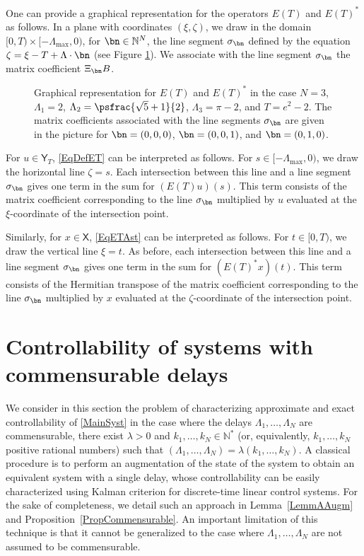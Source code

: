 \begin{remk}
\label{RemkGraphic}
One can provide a graphical representation for the operators $E(T)$ and $E(T)^\ast$ as follows. In a plane with coordinates $(\xi, \zeta)$, we draw in the domain $[0, T) \times [-\Lambda_{\max}, 0)$, for $\bn \in \mathbb N^N$, the line segment $\sigma_{\bn}$ defined by the equation $\zeta = \xi - T + \Lambda \cdot \bn$ (see Figure \ref{FigET}). We associate with the line segment $\sigma_{\bn}$ the matrix coefficient $\Xi_{\bn} B$.

\begin{figure}[ht]
\centering

\caption{Graphical representation for $E(T)$ and $E(T)^\ast$ in the case $N = 3$, $\Lambda_1 = 2$, $\Lambda_2 = \psfrac{\sqrt{5}+1}{2}$, $\Lambda_3 = \pi - 2$, and $T = e^2 - 2$. The matrix coefficients associated with the line segments $\sigma_{\bn}$ are given in the picture for $\bn = (0, 0, 0)$, $\bn = (0, 0, 1)$, and $\bn = (0, 1, 0)$.}
\label{FigET}
\end{figure}

For $u \in \mathsf Y_T$, \eqref{EqDefET} can be interpreted as follows. For $s \in [-\Lambda_{\max}, 0)$, we draw the horizontal line $\zeta = s$. Each intersection between this line and a line segment $\sigma_{\bn}$ gives one term in the sum for $(E(T)u)(s)$. This term consists of the matrix coefficient corresponding to the line $\sigma_{\bn}$ multiplied by $u$ evaluated at the $\xi$-coordinate of the intersection point.

Similarly, for $x \in \mathsf X$, \eqref{EqETAst} can be interpreted as follows. For $t \in [0, T)$, we draw the vertical line $\xi = t$. As before, each intersection between this line and a line segment $\sigma_{\bn}$ gives one term in the sum for $(E(T)^\ast x)(t)$. This term consists of the Hermitian transpose of the matrix coefficient corresponding to the line $\sigma_{\bn}$ multiplied by $x$ evaluated at the $\zeta$-coordinate of the intersection point.
\end{remk}

\section{Controllability of systems with commensurable delays}
\label{SecCommensurable}

We consider in this section the problem of characterizing approximate and exact controllability of \eqref{MainSyst} in the case where the delays $\Lambda_1, \dots, \Lambda_N$ are commensurable, \ie there exist $\lambda > 0$ and $k_1, \dots, k_N \in \mathbb N^\ast$ (or, equivalently, $k_1, \dots, k_N$ positive rational numbers) such that $(\Lambda_1, \dots, \Lambda_N) = \lambda (k_1, \dots, k_N)$. A classical procedure is to perform an augmentation of the state of the system to obtain an equivalent system with a single delay, whose controllability can be easily characterized using Kalman criterion for discrete-time linear control systems. For the sake of completeness, we detail such an approach in Lemma~\ref{LemmAAugm} and Proposition~\ref{PropCommensurable}. An important limitation of this technique is that it cannot be generalized to the case where $\Lambda_1, \dots, \Lambda_N$ are not assumed to be commensurable.

